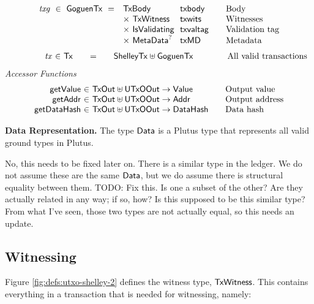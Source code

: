\begin{figure*}[htb]
\begin{equation*}
\begin{array}{r@{~~}l@{~~}l@{\qquad}l}
      \var{txg} ~\in~ \GoguenTx ~=~
      & \TxBody & \fun{txbody} & \text{Body}\\
      & \times ~\TxWitness & \fun{txwits} & \text{Witnesses}\\
      & \times ~\IsValidating & \fun{txvaltag}&\text{Validation tag}\\
      & \times ~\MetaData^? & \fun{txMD}&\text{Metadata}\\
    \end{array}
  \end{equation*}
  \begin{equation*}
    \begin{array}{r@{~\in~}l@{\qquad=\qquad}l@{\qquad\qquad}l}
\qquad\qquad      \var{tx} & \Tx & \ShelleyTx \uniondistinct \GoguenTx &
      \text{All valid transactions}\\
    \end{array}
  \end{equation*}
  \emph{Accessor Functions}
  \begin{equation*}
    \begin{array}{r@{~\in~}l@{\qquad}l}
      \fun{getValue} & \TxOut \uniondistinct \UTxOOut \to \Value & \text{Output value} \\
      \fun{getAddr} & \TxOut \uniondistinct \UTxOOut \to \Addr & \text{Output address} \\
      \fun{getDataHash} & \TxOut \uniondistinct \UTxOOut \to \DataHash & \text{Data hash}
    \end{array}
  \end{equation*}
  \caption{Definitions for transactions, cont.}
  \label{fig:defs:utxo-shelley-2}
\end{figure*}


\textbf{Data Representation.}
The type $\mathsf{Data}$ is a Plutus type that represents all valid ground types in Plutus.
\begin{note}
  No, this needs to be fixed later on.
There is a similar type in the
ledger. We do not assume these are the same $\mathsf{Data}$, but we do assume there
is structural equality between them. TODO: {Fix this.  Is one a subset of the other?  Are they actually related in any way; if so, how?}
  Is this supposed to be this similar type? From what I've seen, those
  two types are not actually equal, so this needs an update.
\end{note}

\subsection{Witnessing}
Figure \ref{fig:defs:utxo-shelley-2} defines the witness type, $\mathsf{TxWitness}$.  This contains everything
in a transaction that is needed for witnessing, namely:

